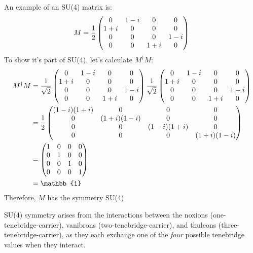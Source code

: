 \begin{example}
  An example of an SU(4) matrix is:
  \[
    M=\frac{1}{2}
    \begin{pmatrix}
      0 & 1-i & 0 & 0 \\
      1+i & 0 & 0 & 0 \\
      0 & 0 & 0 & 1-i \\
      0 & 0 & 1+i & 0
    \end{pmatrix}
  \]
  To show it's part of SU(4), let's calculate \(M^{\dag}M\):
  \begin{align*}
    M^{\dag} M
     & = \nsqrt{2}
    \begin{pmatrix}
      \fourrow{0}{1-i}{0}{0} \\
      \fourrow{1+i}{0}{0}{0} \\
      \fourrow{0}{0}{0}{1-i} \\
      \fourrow{0}{0}{1+i}{0}
    \end{pmatrix}
    \nsqrt{2}
    \begin{pmatrix}
      \fourrow{0}{1-i}{0}{0} \\
      \fourrow{1+i}{0}{0}{0} \\
      \fourrow{0}{0}{0}{1-i} \\
      \fourrow{0}{0}{1+i}{0}
    \end{pmatrix}        \\
     & = \frac{1}{2}
    \begin{pmatrix}
      \fourrow{(1-i)(1+i)}{0}{0}{0} \\
      \fourrow{0}{(1+i)(1-i)}{0}{0} \\
      \fourrow{0}{0}{(1-i)(1+i)}{0} \\
      \fourrow{0}{0}{0}{(1+i)(1-i)}
    \end{pmatrix} \\
     & =
    \begin{pmatrix}
      \fourrow{1}{0}{0}{0} \\
      \fourrow{0}{1}{0}{0} \\
      \fourrow{0}{0}{1}{0} \\
      \fourrow{0}{0}{0}{1}
    \end{pmatrix}          \\
     & = \mathbb{1}
  \end{align*}
  Therefore, \(M\) has the symmetry SU(4)
\end{example}

SU(4) symmetry arises from the interactions between the noxions (one-tenebridge-carrier), vanibrons (two-tenebridge-carrier), and thuleons (three-tenebridge-carrier), as they each exchange one of the \textit{four} possible tenebridge values when they interact.


